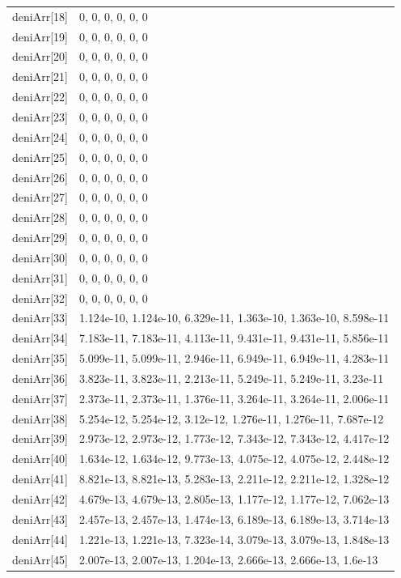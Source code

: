 {\begin{longtable}{p{}p{}}
{}deniArr[18] & 0, 0, 0, 0, 0, 0\\
{}deniArr[19] & 0, 0, 0, 0, 0, 0\\
{}deniArr[20] & 0, 0, 0, 0, 0, 0\\
{}deniArr[21] & 0, 0, 0, 0, 0, 0\\
{}deniArr[22] & 0, 0, 0, 0, 0, 0\\
{}deniArr[23] & 0, 0, 0, 0, 0, 0\\
{}deniArr[24] & 0, 0, 0, 0, 0, 0\\
{}deniArr[25] & 0, 0, 0, 0, 0, 0\\
{}deniArr[26] & 0, 0, 0, 0, 0, 0\\
{}deniArr[27] & 0, 0, 0, 0, 0, 0\\
{}deniArr[28] & 0, 0, 0, 0, 0, 0\\
{}deniArr[29] & 0, 0, 0, 0, 0, 0\\
{}deniArr[30] & 0, 0, 0, 0, 0, 0\\
{}deniArr[31] & 0, 0, 0, 0, 0, 0\\
{}deniArr[32] & 0, 0, 0, 0, 0, 0\\
{}deniArr[33] & 1.124e-10, 1.124e-10, 6.329e-11, 1.363e-10, 1.363e-10, 8.598e-11\\
{}deniArr[34] & 7.183e-11, 7.183e-11, 4.113e-11, 9.431e-11, 9.431e-11, 5.856e-11\\
{}deniArr[35] & 5.099e-11, 5.099e-11, 2.946e-11, 6.949e-11, 6.949e-11, 4.283e-11\\
{}deniArr[36] & 3.823e-11, 3.823e-11, 2.213e-11, 5.249e-11, 5.249e-11, 3.23e-11\\
{}deniArr[37] & 2.373e-11, 2.373e-11, 1.376e-11, 3.264e-11, 3.264e-11, 2.006e-11\\
{}deniArr[38] & 5.254e-12, 5.254e-12, 3.12e-12, 1.276e-11, 1.276e-11, 7.687e-12\\
{}deniArr[39] & 2.973e-12, 2.973e-12, 1.773e-12, 7.343e-12, 7.343e-12, 4.417e-12\\
{}deniArr[40] & 1.634e-12, 1.634e-12, 9.773e-13, 4.075e-12, 4.075e-12, 2.448e-12\\
{}deniArr[41] & 8.821e-13, 8.821e-13, 5.283e-13, 2.211e-12, 2.211e-12, 1.328e-12\\
{}deniArr[42] & 4.679e-13, 4.679e-13, 2.805e-13, 1.177e-12, 1.177e-12, 7.062e-13\\
{}deniArr[43] & 2.457e-13, 2.457e-13, 1.474e-13, 6.189e-13, 6.189e-13, 3.714e-13\\
{}deniArr[44] & 1.221e-13, 1.221e-13, 7.323e-14, 3.079e-13, 3.079e-13, 1.848e-13\\
{}deniArr[45] & 2.007e-13, 2.007e-13, 1.204e-13, 2.666e-13, 2.666e-13, 1.6e-13\\

\end{longtable}}
